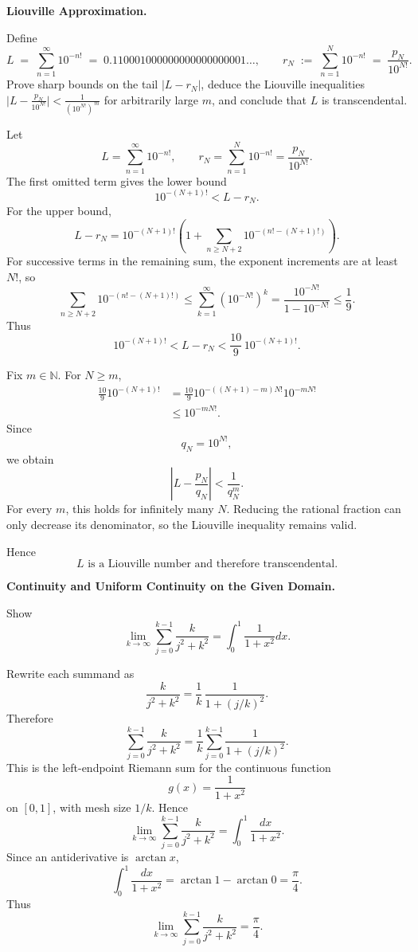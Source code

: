 \begin{problem}[CP-II-0491]
\label{prob:cp-ii-0491}
\textbf{Liouville Approximation.}

\hspace*{1.5em}Define
	\[
	L \;=\; \sum_{n=1}^{\infty} 10^{-n!}
	\;=\; 0.110001000000000000000001\ldots,
	\qquad
	r_N \;:=\; \sum_{n=1}^{N} 10^{-n!} \;=\; \frac{p_N}{10^{N!}}.
	\]
	Prove sharp bounds on the tail $|L-r_N|$, deduce the Liouville inequalities
	\(
	\bigl|L-\frac{p_N}{10^{N!}}\bigr| < \frac{1}{(10^{N!})^{\,m}}
	\)
	for arbitrarily large $m$, and conclude that $L$ is transcendental.
\end{problem}

\begin{solution}
Let
\[
L=\sum_{n=1}^{\infty}10^{-n!},
\qquad
r_N=\sum_{n=1}^{N}10^{-n!}
=\frac{p_N}{10^{N!}}.
\]
The first omitted term gives the lower bound
\[
\boxed{
10^{-(N+1)!}
<
L-r_N.
}
\]
For the upper bound,
\[
L-r_N
=
10^{-(N+1)!}
\left(
1+
\sum_{n\ge N+2}
10^{-(n!-(N+1)!)}
\right).
\]
For successive terms in the remaining sum, the exponent increments are at least \(N!\), so
\[
\sum_{n\ge N+2}
10^{-(n!-(N+1)!)}
\le
\sum_{k=1}^{\infty}(10^{-N!})^k
=
\frac{10^{-N!}}{1-10^{-N!}}
\le
\frac19.
\]
Thus
\[
\boxed{
10^{-(N+1)!}
<
L-r_N
<
\frac{10}{9}\,10^{-(N+1)!}.
}
\]

Fix \(m\in\mathbb N\). For \(N\ge m\),
\[
\begin{aligned}
\frac{10}{9}10^{-(N+1)!}
&=
\frac{10}{9}
10^{-((N+1)-m)N!}
10^{-mN!}\\
&\le
10^{-mN!}.
\end{aligned}
\]
Since
\[
q_N=10^{N!},
\]
we obtain
\[
\left|
L-\frac{p_N}{q_N}
\right|
<
\frac1{q_N^m}.
\]
For every \(m\), this holds for infinitely many \(N\). Reducing the rational fraction can
only decrease its denominator, so the Liouville inequality remains valid.

Hence
\[
\boxed{
L\text{ is a Liouville number and therefore transcendental}.
}
\]
\end{solution}


\begin{problem}[CP-II-0493]
\label{prob:cp-ii-0493}
\textbf{Continuity and Uniform Continuity on the Given Domain.}

\hspace*{1.5em}Show
\[
\lim_{k\to\infty}\sum_{j=0}^{k-1}\frac{k}{j^2+k^2}=\int_0^1\frac{1}{1+x^2}dx.
\]
\end{problem}

\begin{solution}
Rewrite each summand as
\[
\frac{k}{j^2+k^2}
=
\frac1k\,\frac{1}{1+(j/k)^2}.
\]
Therefore
\[
\sum_{j=0}^{k-1}\frac{k}{j^2+k^2}
=
\frac1k\sum_{j=0}^{k-1}
\frac{1}{1+(j/k)^2}.
\]
This is the left-endpoint Riemann sum for the continuous function
\[
g(x)=\frac{1}{1+x^2}
\]
on \([0,1]\), with mesh size \(1/k\). Hence
\[
\lim_{k\to\infty}
\sum_{j=0}^{k-1}\frac{k}{j^2+k^2}
=
\int_0^1\frac{dx}{1+x^2}.
\]
Since an antiderivative is \(\arctan x\),
\[
\int_0^1\frac{dx}{1+x^2}
=
\arctan1-\arctan0
=
\frac{\pi}{4}.
\]
Thus
\[
\boxed{
\lim_{k\to\infty}
\sum_{j=0}^{k-1}\frac{k}{j^2+k^2}
=
\frac{\pi}{4}.
}
\]
\end{solution}

